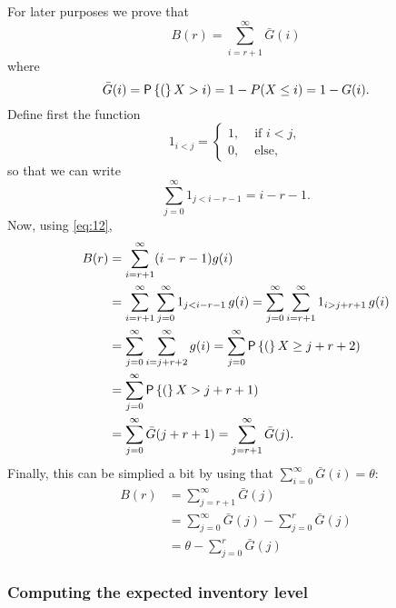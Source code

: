For later purposes we prove that
\begin{equation}
  \label{eq:17}
   B(r) = \sum_{i=r+1}^{\infty} \bar G(i)
\end{equation}
where
\begin{equation}
  \label{eq:18}
   \bar G(i) = \P(X>i) = 1 - P(X\leq i) = 1 - G(i).
\end{equation}
Define first the function
\begin{equation*}
   1_{i< j} =
     \begin{cases}
       1, &\text{  if } i < j, \\
   0, &\text{ else},
     \end{cases}
\end{equation*}
so that we can write
\begin{equation*}
  \sum_{j=0}^\infty 1_{j< i-r - 1} = i-r -1.
\end{equation*}
Now, using \ref{eq:12},
\begin{equation}
  \label{eq:19}
  \begin{split}
       B(r) &= 
   \sum_{i=r+1}^\infty (i-r-1) g(i)   \\
   &= \sum_{i=r+1}^\infty\sum_{j=0}^\infty 1_{j < i-r-1}\, g(i)   = 
    \sum_{j=0}^\infty \sum_{i=r+1}^\infty 1_{i > j +r + 1}\, g(i)\\
   &= \sum_{j=0}^\infty \sum_{i=j + r+2}^\infty  g(i) = 
   \sum_{j=0}^\infty \P(X \geq j + r+2)  \\
   &=\sum_{j=0}^\infty \P(X > j + r+1)  \\
   &= \sum_{j=0}^\infty \bar G(j+r+1) =\sum_{j=r+1}^\infty  \bar G(j).
  \end{split}
\end{equation}
Finally, this can be simplied a bit by using that
$\sum_{i=0}^\infty \bar G(i) = \theta$:
\begin{equation}
  \label{eq:119}
  \begin{split}
   B(r) 
   &= \sum_{j=r+1}^\infty  \bar G(j) \\
   &= \sum_{j=0}^\infty  \bar G(j) - \sum_{j=0}^{r} \bar G(j)\\
   &= \theta - \sum_{j=0}^{r} \bar G(j)
  \end{split}
\end{equation}
	   

\subsubsection{Computing the expected inventory level}

